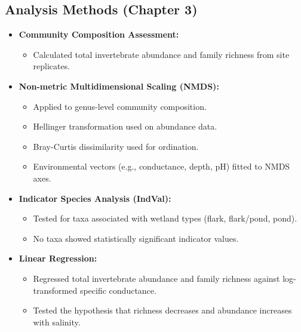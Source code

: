\subsection{Analysis Methods (Chapter 3)}
\begin{itemize}
  \item \textbf{Community Composition Assessment:}
    \begin{itemize}
      \item Calculated total invertebrate abundance and family richness from site replicates.
    \end{itemize}

  \item \textbf{Non-metric Multidimensional Scaling (NMDS):}
    \begin{itemize}
      \item Applied to genus-level community composition.
      \item Hellinger transformation used on abundance data.
      \item Bray-Curtis dissimilarity used for ordination.
      \item Environmental vectors (e.g., conductance, depth, pH) fitted to NMDS axes.
    \end{itemize}

  \item \textbf{Indicator Species Analysis (IndVal):}
    \begin{itemize}
      \item Tested for taxa associated with wetland types (flark, flark/pond, pond).
      \item No taxa showed statistically significant indicator values.
    \end{itemize}

  \item \textbf{Linear Regression:}
    \begin{itemize}
      \item Regressed total invertebrate abundance and family richness against log-transformed specific conductance.
      \item Tested the hypothesis that richness decreases and abundance increases with salinity.
    \end{itemize}
\end{itemize}

